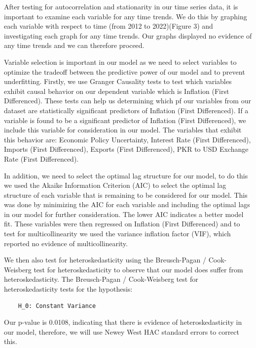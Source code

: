 \documentclass[11pt]{article}
\begin{document}
After testing for autocorrelation and stationarity in our time series data, it is important to examine each variable for any time trends. We do this by graphing each variable with respect to time (from 2012 to 2022)(Figure 3) and investigating each graph for any time trends. Our graphs displayed no evidence of any time trends and we can therefore proceed.\newline

Variable selection is important in our model as we need to select variables to optimize the tradeoff between the predictive power of our model and to prevent underfitting. Firstly, we use Granger Causality tests to test which variables exhibit causal behavior on our dependent variable which is Inflation (First Differenced). These tests can help us determining which pf our variables from our dataset are statistically significant predictors of Inflation (First Differenced). If a variable is found to be a significant predictor of Inflation (First Differenced), we include this variable for consideration in our model. The variables that exhibit this behavior are: Economic Policy Uncertainty, Interest Rate (First Differenced), Imports (First Differenced), Exports (First Differenced), PKR to USD Exchange Rate (First Differenced). \newline

In addition, we need to select the optimal lag structure for our model, to do this we used the Akaike Information Criterion (AIC) to select the optimal lag structure of each variable that is remaining to be considered for our model. This was done by minimizing the AIC for each variable and including the optimal lags in our model for further consideration. The lower AIC indicates a better model fit. These variables were then regressed on Inflation (First Differenced) and to test for multicollinearity we used the variance inflation factor (VIF), which reported no evidence of multicollinearity. \newline

We then also test for heteroskedasticity using the Breusch-Pagan / Cook-Weisberg test for heteroskedasticity to observe that our model does  suffer from heteroskedasticity. The Breusch-Pagan / Cook-Weisberg test for heteroskedasticity tests for the hypothesis:
\begin{verbatim}
    H_0: Constant Variance    
\end{verbatim}
Our p-value is 0.0108, indicating that there is evidence of heteroskedasticity in our model, therefore, we will use Newey West HAC standard errors to correct this.\newline
\end{document}
